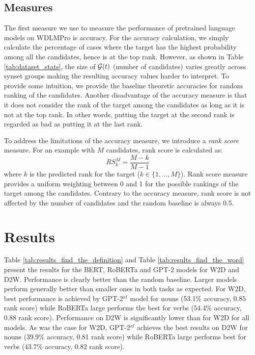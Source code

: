 \documentclass[11pt,a4paper]{article}
\begin{document}

\subsection{Measures}

The first measure we use to measure the performance of
pretrained language models on WDLMPro is accuracy. For the
accuracy calculation, we simply calculate the percentage of
cases where the target has the highest probability among
all the candidates, hence is at the top rank. However, as
shown in Table \ref{tab:dataset_stats},
the size of ${\cal G}(t)$ 
(number of candidates)
varies greatly across  synset groups making
the resulting accuracy values harder to interpret. To
provide some intuition, we provide the baseline theoretic
accuracies for random ranking of the candidates. Another
disadvantage of the accuracy measure is that it does not
consider the rank of the target among the candidates as long
as it is not at the top rank. In other words, putting the
target at the second rank is regarded as bad as putting it
at the last rank.

To address the limitations of the accuracy measure, we introduce a \textit{rank score} measure. For an example with $M$ candidates, rank score is calculated as:
\begin{equation*}
    RS^M_k = \frac{M-k}{M-1}
\end{equation*}
where $k$ is the predicted rank for the target ($k \in
\{1,...,M\}$). Rank score measure provides a uniform
weighting between 0 and 1 for the possible rankings of the
target among the candidates. Contrary to the accuracy measure, rank score is not affected by the number of candidates and the random baseline is always 0.5.  


\section{Results}

Table \ref{tab:results_find_the_definition} and Table
\ref{tab:results_find_the_word} present the results for the
BERT, RoBERTa and GPT-2 models
for W2D and D2W. Performance is clearly better than the
random baseline.
Larger models perform generally better than smaller
ones in both tasks as expected. For W2D,
best performance is achieved by GPT-2$^{xl}$ model for 
nouns (53.1\% accuracy, 0.85 rank score) while RoBERTa large
performs the best for  verbs (54.4\% accuracy, 0.88 rank
score). Performance on D2W is
significantly lower than for W2D for all
models.  As was the case for W2D, GPT-2$^{xl}$ achieves the
best results on D2W for  nouns (39.9\% accuracy, 0.81 rank
score) while RoBERTa large performs best for  verbs
(43.7\% accuracy, 0.82 rank score).
\end{document}
